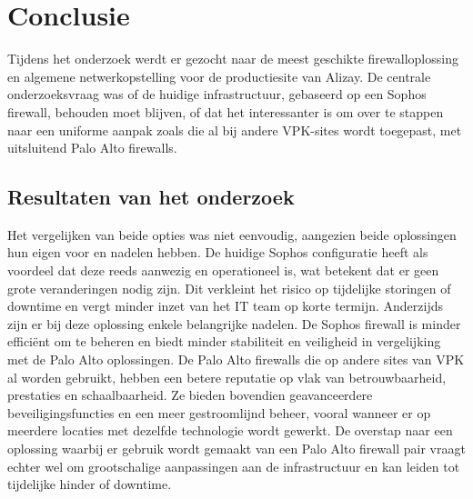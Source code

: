 
\chapter{Conclusie}%
\label{ch:conclusie}




Tijdens het onderzoek werdt er gezocht naar de meest geschikte firewalloplossing en algemene netwerkopstelling voor de productiesite van Alizay. De centrale onderzoeksvraag was of de huidige infrastructuur, gebaseerd op een Sophos firewall, behouden moet blijven, of dat het interessanter is om over te stappen naar een uniforme aanpak zoals die al bij andere VPK-sites wordt toegepast, met uitsluitend Palo Alto firewalls.

\section{Resultaten van het onderzoek}
Het vergelijken van beide opties was niet eenvoudig, aangezien beide oplossingen hun eigen voor en nadelen hebben. De huidige Sophos configuratie heeft als voordeel dat deze reeds aanwezig en operationeel is, wat betekent dat er geen grote veranderingen nodig zijn. Dit verkleint het risico op tijdelijke storingen of downtime en vergt minder inzet van het IT team op korte termijn. Anderzijds zijn er bij deze oplossing enkele belangrijke nadelen. De Sophos firewall is minder efficiënt om te beheren en biedt minder stabiliteit en veiligheid in vergelijking met de Palo Alto oplossingen.
De Palo Alto firewalls die op andere sites van VPK al worden gebruikt, hebben een betere reputatie op vlak van betrouwbaarheid, prestaties en schaalbaarheid. Ze bieden bovendien geavanceerdere beveiligingsfuncties en een meer gestroomlijnd beheer, vooral wanneer er op meerdere locaties met dezelfde technologie wordt gewerkt. De overstap naar een oplossing waarbij er gebruik wordt gemaakt van een Palo Alto firewall pair vraagt echter wel om grootschalige aanpassingen aan de infrastructuur en kan leiden tot tijdelijke hinder of downtime.


